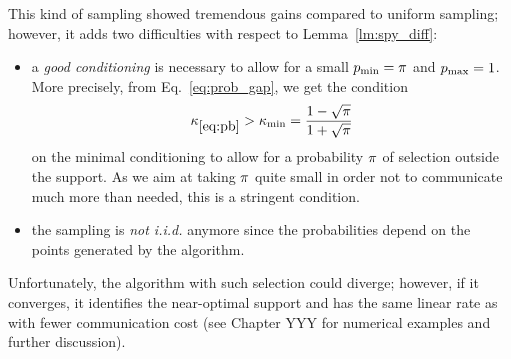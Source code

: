 This kind of sampling showed tremendous gains compared to uniform sampling; however, it adds two difficulties with respect to Lemma~\ref{lm:spy_diff}:
\begin{itemize}
    \item a \emph{good conditioning} is necessary to allow for a small $p_{\min}=\pi$ and $p_{\max}=1$. More precisely, from Eq.~\eqref{eq:prob_gap}, we get the condition
    \begin{equation}\label{eq:kappamin}
        \kappa_{\eqref{eq:pb}} > \kappa_{\min} = \frac{1-\sqrt{\pi}}{1+\sqrt{\pi}}
    \end{equation}
    on the minimal conditioning to allow for a probability $\pi$ of selection outside the support. As we aim at taking $\pi$ quite small in order not to communicate much more than needed, this is a stringent condition.
    \item the sampling is \emph{not i.i.d.} anymore since the probabilities depend on the points generated by the algorithm.
\end{itemize}

Unfortunately, the algorithm with such selection could diverge; however, if it converges, it identifies the near-optimal support and has the same linear rate as \dave with fewer communication cost  (see Chapter YYY for numerical examples and further discussion).

